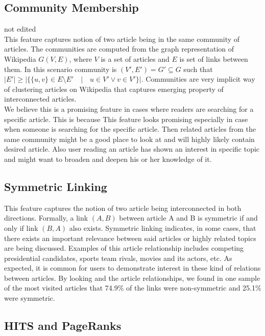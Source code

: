 \subsection{Community Membership}
not edited \\
This feature captures notion of two article being in the same community of articles. The communities are computed from the graph representation of Wikipedia $G(V,E)$, where $V$ is a set of articles and $E$ is set of links between them. In this scenario community is $(V', E') = G' \subseteq G$ such that $|E'| \ge |\{ \{u,v\} \in E\setminus E'  \quad | \quad u \in V' \vee v \in V' \}|$. Communities are very implicit way of clustering articles on Wikipedia that captures emerging property of interconnected articles.  \\

We believe this is a promising feature in cases where readers are searching for a specific article. This is because
This feature looks promising especially in case when someone is searching for the specific article. Then related articles from the same community might be a good place to look at and will highly likely contain desired article. Also user reading an article has shown an interest in specific topic and might want to broaden and deepen his or her knowledge of it.

\subsection{Symmetric Linking}
This feature captures the notion of two article being interconnected in both directions. Formally, a link $(A,B)$ between article A and B is symmetric if and only if link $(B,A)$ also exists. Symmetric linking indicates, in some cases, that there exists an important relevance between said articles or highly related topics are being discussed. Examples of this article relationship includes competing presidential candidates, sports team rivals, movies and its actors, etc. As expected, it is common for users to demonstrate interest in these kind of relations between articles. By looking and the article relationships, we found in one sample of the most visited articles that 74.9\% of the links were non-symmetric and 25.1\% were symmetric.

\subsection{HITS and PageRanks}


\lipsum[4] %
